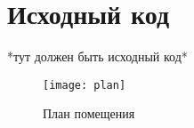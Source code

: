 \chapter{Исходный код}
*тут должен быть исходный код*
\begin{figure}[h]
\texttt{[image: plan]}
\caption{План помещения}
\end{figure}